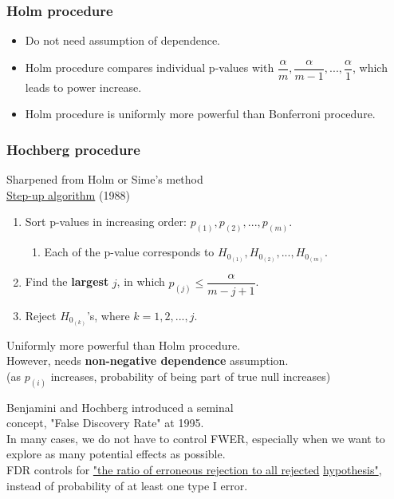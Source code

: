 \documentclass{beamer}
\begin{document}
\frame
{
    \frametitle{Holm procedure}
    \begin{itemize}
      \item Do not need assumption of dependence. \vspace{0.1in}\\
      \item Holm procedure compares individual p-values with $\dfrac{\alpha}{m}, \dfrac{\alpha}{m-1}, ..., \dfrac{\alpha}{1}$, which leads to power increase. \vspace{0.1in}\\
      \item Holm procedure is uniformly more powerful than Bonferroni procedure.
    \end{itemize}
}

\frame
{
    \frametitle{Hochberg procedure}
    Sharpened from Holm or Sime's method \vspace{0.1in}\\
    \underline{Step-up algorithm} (1988) \vspace{0.2in}\\
    \begin{enumerate}
  \item Sort p-values in increasing order: $p_{(1)}, p_{(2)}, ..., p_{(m)}$.
    \begin{enumerate}[-]
    \item Each of the p-value corresponds to $H_{0_{(1)}}, H_{0_{(2)}}, ..., H_{0_{(m)}}$. 
    \end{enumerate}
  \item Find the \textbf{largest} $j$, in which $p_{(j)} \leq \dfrac{\alpha}{m-j+1}$.
  \item Reject $H_{0_{(k)}}$'s, where $k=1, 2, ..., j$.\vspace{0.22in}\\
  \end{enumerate}  
  Uniformly more powerful than Holm procedure. \vspace{0.07in}\\
  However, needs \textbf{non-negative dependence} assumption. \\
  (as $p_{(i)}$ increases, probability of being part of true null increases)
}


\frame
{
    \center \Large{Benjamini and Hochberg introduced a seminal\\ concept, "False Discovery Rate" at 1995.} \vspace{0.2in}\\
    \flushleft \normalsize In many cases, we do not have to control FWER, especially when we want to explore as many potential effects as possible. \vspace{0.1in}\\
    FDR controls for \underline{"the ratio of erroneous rejection to all rejected} \underline{hypothesis"}, instead of probability of at least one type I error.
}
\end{document}
